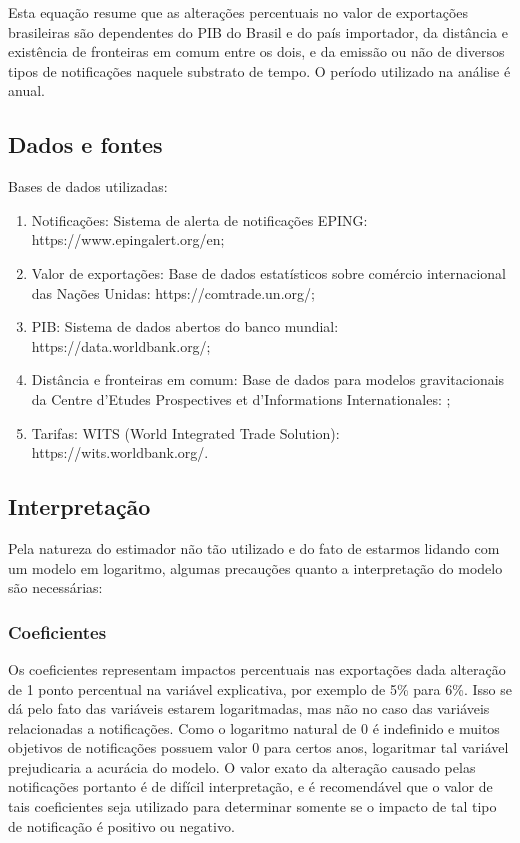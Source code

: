 \documentclass[12pt, a4paper]{article}
\begin{document}
Esta equação resume que as alterações percentuais no valor de exportações brasileiras são dependentes do PIB do Brasil e do país importador, da distância e existência de fronteiras em comum entre os dois, e da emissão ou não de diversos tipos de notificações naquele substrato de tempo. O período utilizado na análise é anual.

\subsection{Dados e fontes}

Bases de dados utilizadas:

\begin{enumerate}
    \item Notificações: Sistema de alerta de notificações EPING: https://www.epingalert.org/en;
    \item Valor de exportações: Base de dados estatísticos sobre comércio internacional das Nações Unidas: https://comtrade.un.org/;
    \item PIB: Sistema de dados abertos do banco mundial: https://data.worldbank.org/;
    \item Distância e fronteiras em comum: Base de dados para modelos gravitacionais da Centre d'Etudes Prospectives et d'Informations Internationales: \cite{CEPII};
    \item Tarifas: WITS (World Integrated Trade Solution): https://wits.worldbank.org/.
\end{enumerate}

\subsection{Interpretação}

Pela natureza do estimador não tão utilizado e do fato de estarmos lidando com um modelo em logaritmo, algumas precauções quanto a interpretação do modelo são necessárias:

\subsubsection{Coeficientes}

Os coeficientes representam impactos percentuais nas exportações dada alteração de 1 ponto percentual na variável explicativa, por exemplo de 5\% para 6\%. Isso se dá pelo fato das variáveis estarem logaritmadas, mas não no caso das variáveis relacionadas a notificações. Como o logaritmo natural de 0 é indefinido e muitos objetivos de notificações possuem valor 0 para certos anos, logaritmar tal variável prejudicaria a acurácia do modelo. O valor exato da alteração causado pelas notificações portanto é de difícil interpretação, e é recomendável que o valor de tais coeficientes seja utilizado para determinar somente se o impacto de tal tipo de notificação é positivo ou negativo.
\end{document}
